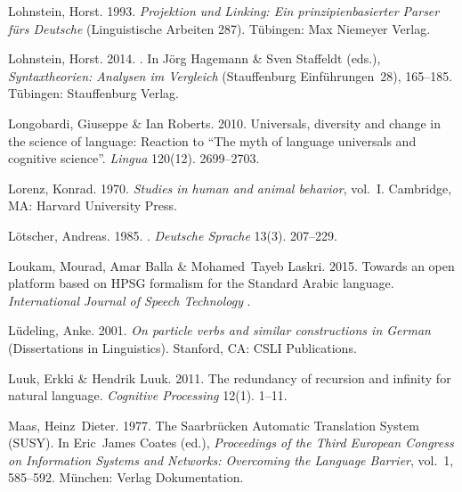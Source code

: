 \begin{thebibliography}{1420}
Lohnstein, Horst. 1993.
\newblock \emph{{Projektion und Linking: Ein prinzipienbasierter Parser
  f{\"u}rs Deutsche}} (Linguistische Arbeiten 287).
\newblock T{\"u}bingen: Max Niemeyer Verlag.

Lohnstein, Horst. 2014.
.
\newblock In J{\"o}rg Hagemann \& Sven Staffeldt (eds.), \emph{{Syntaxtheorien:
  Analysen im Vergleich}} (Stauffenburg Einf{\"u}hrungen~28), 165--185.
  T\"u\-bing\-en: Stauffenburg Verlag.

Longobardi, Giuseppe \& Ian Roberts. 2010.
\newblock Universals, diversity and change in the science of language:
  {Reaction} to ``{The} myth of language universals and cognitive science''.
\newblock \emph{Lingua} 120(12). 2699--2703.

Lorenz, Konrad. 1970.
\newblock \emph{Studies in human and animal behavior}, vol.~I.
\newblock Cambridge, MA: Harvard University Press.

L{\"o}tscher, Andreas. 1985.
.
\newblock \emph{Deutsche Sprache} 13(3). 207--229.

Loukam, Mourad, Amar Balla \& Mohamed~Tayeb Laskri. 2015.
\newblock Towards an open platform based on {HPSG} formalism for the {Standard
  Arabic} language.
\newblock \emph{International Journal of Speech Technology}
  .

L{\"u}deling, Anke. 2001.
\newblock \emph{On particle verbs and similar constructions in {German}}
  (Dissertations in Linguistics).
\newblock Stanford, CA: CSLI Publications.

Luuk, Erkki \& Hendrik Luuk. 2011.
\newblock The redundancy of recursion and infinity for natural language.
\newblock \emph{Cognitive Processing} 12(1). 1--11.

Maas, Heinz~Dieter. 1977.
\newblock The {Saarbr{\"u}cken Automatic Translation System} ({SUSY}).
\newblock In Eric~James Coates (ed.), \emph{Proceedings of the {Third European
  Congress on Information Systems and Networks: Overcoming the Language
  Barrier}}, vol.~1, 585--592. M{\"u}nchen: Verlag Dokumentation.


\end{thebibliography}
